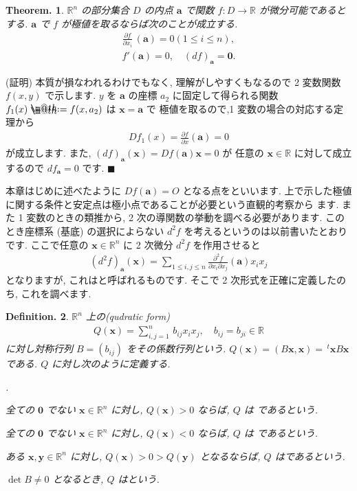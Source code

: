 \documentclass[openany, a4paper, oneside]{book}
\makeatletter
\newcounter{enum2}
\renewenvironment{enumerate}{%
\begin{list}%
{%
\arabic{enum2}.\ \,%
}%
{%
\usecounter{enum2}
\setlength{\itemindent}{0pt}%
\setlength{\leftmargin}{6pt}%
\setlength{\rightmargin}{0pt}%
\setlength{\labelsep}{0pt}%
\setlength{\labelwidth}{6pt}%
\setlength{\itemsep}{0pt}%
\setlength{\parsep}{0pt}%
\setlength{\listparindent}{0pt}%
}
}{%
\end{list}%
}
\newcommand*{\defeq}{\mathrel{\rlap{%
\raisebox{0.3ex}{$\m@th\cdot$}}%
\raisebox{-0.3ex}{$\m@th\cdot$}}%
=}
\theoremstyle{break}
\newtheorem{thm}{Theorem.}[section]
\theoremstyle{breakdefn}
\newtheorem{defn}[thm]{Definition.}
\newcommand{\bbR}{\mathbb{R}}
\newcommand{\bs}{\blacksquare}
\makeatother
\begin{document}
\begin{thm}
$\bbR^n$ の部分集合 $D$ の内点 $\bm{a}$ で関数 $f:D\to\bbR$ が微分可能であるとする.
$\bm{a}$ で $f$ が極値を取るならば次のことが成立する.
\begin{align}
\frac{\partial f} {\partial x_i} \, (\bm{a})
=
0
(1 \leq i \leq n),\\
f'(\bm{a}) = 0,
\quad
(df) _{\bm{a}}=\bm{0}.
\end{align}
\end{thm}
(証明)
本質が損なわれるわけでもなく, 理解がしやすくもなるので 2 変数関数 $f (x,y)$ で示します.
$y$ を $\bm{a}$ の座標 $a_2$ に固定して得られる関数 $f_1 (x) \defeq f (x,a_2)$ は $\bm{x}=\bm{a}$ で
極値を取るので,1 変数の場合の対応する定理から
\begin{align}
D f_1 (x)
=
\frac{\partial f} {\partial x} ( \bm{a} )
=
0
\end{align}
が成立します. また,  $(df)_{ \bm{a} } ( \bm{x} ) = Df (\bm{a}) \bm{x} = 0$ が
任意の $\bm{x} \in \bbR$ に対して成立するので $df_{ \bm{a} } = 0$ です.  $\bs$

本章はじめに述べたように $Df (\bm{a})=O$ となる点をといいます.
上で示した極値に関する条件と安定点は極小点であることが必要という直観的考察から
ます.
また 1 変数のときの類推から, 2 次の導関数の挙動を調べる必要があります.
このとき座標系 (基底) の選択によらない $d^2 f$ を考えるというのは以前書いたとおりです.
ここで任意の $\bm{x} \in \bbR^n$ に 2 次微分 $d^2f$ を作用させると
\begin{align}
(d^2 f)_{ \bm{a} } ( \bm{x} )
=
\sum_{1 \leq i ,j \leq n} \frac{ \partial^2 f} {\partial x_i \partial x_j} ( \bm{a} ) x_i  x_j
\end{align}
となりますが, これはと呼ばれるものです.
そこで 2 次形式を正確に定義したのち, これを調べます.

\begin{defn}
$\bbR^n$ 上の(qudratic form)
\begin{align}
Q ( \bm{x} )
=
\sum_{ i,j=1}^n \, b_{ij} x_i x_j , \quad b_{ij} = b_{ji} \in \bbR
\label{eq:8.11}
\end{align}
に対し対称行列 $B = ( b_{ ij } )$ をその係数行列という.
$Q ( \bm{x} ) = ( B\bm{x} , \bm{x} ) = \, ^t \bm{x} B \bm{x}$ である.
$Q$ に対し次のように定義する.
\begin{enumerate}
\item[1)] 全ての $\bm{0}$ でない $\bm{x} \in \bbR^n$ に対し,  $Q (\bm{x})>0$ ならば,  $Q$ は
であるという.
\item[2)] 全ての $\bm{0}$ でない $\bm{x} \in \bbR^n$ に対し,  $Q (\bm{x})<0$ ならば,  $Q$ は
であるという.
\item[3)] ある $\bm{x},\bm{y} \in \bbR^n$ に対し,  $Q (\bm{x}) > 0 > Q (\bm{y})$ となるならば,
$Q$ はであるという.
\item[4)] $\det B \not = 0$ となるとき,  $Q$ はという.
\end{enumerate}
\end{defn}
\end{document}
